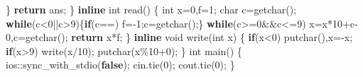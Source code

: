 \documentclass[
]{article}
\newenvironment{Shaded}{}{}
\newcommand{\CharTok}[1]{\textcolor[rgb]{0.25,0.44,0.63}{#1}}
\newcommand{\ControlFlowTok}[1]{\textcolor[rgb]{0.00,0.44,0.13}{\textbf{#1}}}
\newcommand{\DataTypeTok}[1]{\textcolor[rgb]{0.56,0.13,0.00}{#1}}
\newcommand{\DecValTok}[1]{\textcolor[rgb]{0.25,0.63,0.44}{#1}}
\newcommand{\KeywordTok}[1]{\textcolor[rgb]{0.00,0.44,0.13}{\textbf{#1}}}
\newcommand{\NormalTok}[1]{#1}
\newcommand{\OperatorTok}[1]{\textcolor[rgb]{0.40,0.40,0.40}{#1}}
\begin{document}
\begin{Shaded}
\begin{Highlighting}[]
	\OperatorTok{\}}
	\ControlFlowTok{return}\NormalTok{ ans}\OperatorTok{;}
\OperatorTok{\}}
\KeywordTok{inline} \DataTypeTok{int}\NormalTok{ read}\OperatorTok{()} \OperatorTok{\{}
    \DataTypeTok{int}\NormalTok{ x}\OperatorTok{=}\DecValTok{0}\OperatorTok{,}\NormalTok{f}\OperatorTok{=}\DecValTok{1}\OperatorTok{;}
    \DataTypeTok{char}\NormalTok{ c}\OperatorTok{=}\NormalTok{getchar}\OperatorTok{();}
    \ControlFlowTok{while}\OperatorTok{(}\NormalTok{c}\OperatorTok{\textless{}}\CharTok{\textquotesingle{}0\textquotesingle{}}\OperatorTok{||}\NormalTok{c}\OperatorTok{\textgreater{}}\CharTok{\textquotesingle{}9\textquotesingle{}}\OperatorTok{)\{}\ControlFlowTok{if}\OperatorTok{(}\NormalTok{c}\OperatorTok{==}\CharTok{\textquotesingle{}{-}\textquotesingle{}}\OperatorTok{)}\NormalTok{ f}\OperatorTok{={-}}\DecValTok{1}\OperatorTok{;}\NormalTok{c}\OperatorTok{=}\NormalTok{getchar}\OperatorTok{();\}}
    \ControlFlowTok{while}\OperatorTok{(}\NormalTok{c}\OperatorTok{\textgreater{}=}\CharTok{\textquotesingle{}0\textquotesingle{}}\OperatorTok{\&\&}\NormalTok{c}\OperatorTok{\textless{}=}\CharTok{\textquotesingle{}9\textquotesingle{}}\OperatorTok{)}\NormalTok{ x}\OperatorTok{=}\NormalTok{x}\OperatorTok{*}\DecValTok{10}\OperatorTok{+}\NormalTok{c}\OperatorTok{{-}}\CharTok{\textquotesingle{}0\textquotesingle{}}\OperatorTok{,}\NormalTok{c}\OperatorTok{=}\NormalTok{getchar}\OperatorTok{();}
    \ControlFlowTok{return}\NormalTok{ x}\OperatorTok{*}\NormalTok{f}\OperatorTok{;}
\OperatorTok{\}}
\KeywordTok{inline} \DataTypeTok{void}\NormalTok{ write}\OperatorTok{(}\DataTypeTok{int}\NormalTok{ x}\OperatorTok{)}
\OperatorTok{\{}
     \ControlFlowTok{if}\OperatorTok{(}\NormalTok{x}\OperatorTok{\textless{}}\DecValTok{0}\OperatorTok{)}\NormalTok{ putchar}\OperatorTok{(}\CharTok{\textquotesingle{}{-}\textquotesingle{}}\OperatorTok{),}\NormalTok{x}\OperatorTok{={-}}\NormalTok{x}\OperatorTok{;}
     \ControlFlowTok{if}\OperatorTok{(}\NormalTok{x}\OperatorTok{\textgreater{}}\DecValTok{9}\OperatorTok{)}\NormalTok{ write}\OperatorTok{(}\NormalTok{x}\OperatorTok{/}\DecValTok{10}\OperatorTok{);}
\NormalTok{     putchar}\OperatorTok{(}\NormalTok{x}\OperatorTok{\%}\DecValTok{10}\OperatorTok{+}\CharTok{\textquotesingle{}0\textquotesingle{}}\OperatorTok{);}
\OperatorTok{\}}
\DataTypeTok{int}\NormalTok{ main}\OperatorTok{()}
\OperatorTok{\{}
\NormalTok{	ios}\OperatorTok{::}\NormalTok{sync\_with\_stdio}\OperatorTok{(}\KeywordTok{false}\OperatorTok{);}\NormalTok{ cin}\OperatorTok{.}\NormalTok{tie}\OperatorTok{(}\DecValTok{0}\OperatorTok{);}\NormalTok{ cout}\OperatorTok{.}\NormalTok{tie}\OperatorTok{(}\DecValTok{0}\OperatorTok{);}
\OperatorTok{\}}
\end{Highlighting}
\end{Shaded}
\end{document}
